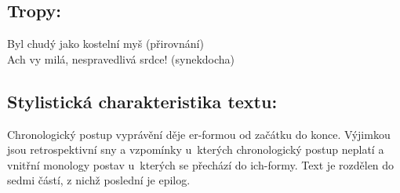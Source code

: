 \documentclass{extarticle} %
\begin{document}
\subsection*{Tropy:}
\noindent 
Byl chudý jako kostelní myš (přirovnání) \\
Ach vy milá, nespravedlivá srdce! (synekdocha)

\subsection*{Stylistická charakteristika textu:}
\noindent 
Chronologický postup vyprávění děje er-formou od začátku do konce. Výjimkou jsou retrospektivní sny a vzpomínky u~kterých chronologický postup neplatí a vnitřní monology postav u~kterých se přechází do ich-formy. Text je rozdělen do sedmi částí, z nichž poslední je epilog.
\end{document}
